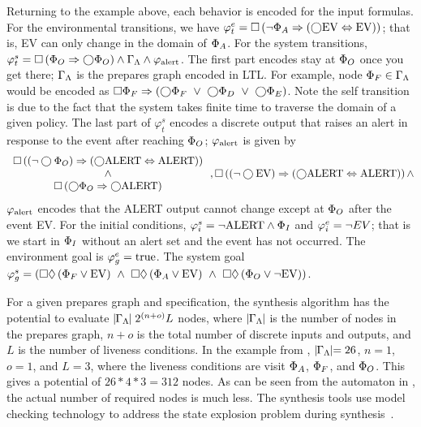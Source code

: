   Returning to the example above, each behavior is encoded for the input
  formulas.  For the environmental transitions, we have $\varphi_t^e =
  \ALWAYS\prl{\NOT \CP_A \Rightarrow \prl{\NEXT \mrm{EV} \Leftrightarrow
      \mrm{EV}}}$; that is, EV can only change in the domain of $\CP_A$.
  For the system transitions, $\varphi_t^s = \ALWAYS\prl{\CP_O
    \Rightarrow \NEXT\CP_O} \AND \GL \AND \varphi_\mrm{alert}$.  The
  first part encodes stay at $\CP_O$ once you get there; $\GL$ is the
  prepares graph encoded in LTL.  For example, node $\CP_F \in \GL$
  would be encoded as $\ALWAYS \CP_F \Rightarrow \prl{\NEXT \CP_F\ \OR \ 
    \NEXT \CP_D\ \OR \ \NEXT\CP_E}$.  Note the self transition is due to
  the fact that the system takes finite time to traverse the domain of a
  given policy.  The last part of $\varphi_t^s$ encodes a discrete
  output that raises an alert in response to the event after reaching
  $\CP_O$; $\varphi_\mrm{alert}$ is given by
  \[
  \bba{c}
  \ALWAYS\prl{\prl{\NOT\NEXT\CP_O} \Rightarrow \prl{\NEXT \mrm{ALERT}
      \Leftrightarrow \mrm{ALERT}}}\\\AND\\\ALWAYS\prl{\NEXT\CP_O \Rightarrow
    \NEXT\mrm{ALERT}}
  \eba
  \, ,
   \ALWAYS\prl{\prl{\NOT\NEXT
      \mrm{EV}} \Rightarrow \prl{\NEXT \mrm{ALERT} \Leftrightarrow
      \mrm{ALERT}}}\\\AND
  \]
  $\varphi_\mrm{alert}$ encodes that the ALERT output cannot change
  except at $\CP_O$ after the event EV.  For the initial conditions,
  $\varphi^s_i = \NOT\mrm{ALERT} \AND \CP_I$ and $\varphi^e_i = \NOT
  EV$; that is we start in $\CP_I$ without an alert set and the event
  has not occurred.  The environment goal is $\varphi_g^e = \mrm{true}$.
  The system goal $\varphi^s_g = \prl{\ALWAYS\EVENTUALLY\prl{\CP_F \OR
      \mrm{EV}}\ \AND\ \ALWAYS\EVENTUALLY\prl{\CP_A \OR \mrm{EV}}\ \AND
         \ \ALWAYS\EVENTUALLY\prl{\CP_O \OR \NOT \mrm{EV}}}$.


 For a given prepares graph and specification, the synthesis algorithm
 has the potential to evaluate $\mid\!\!\GL\!\! \mid 2^{\prl{n+o}} L$
 nodes, where $\mid\!\!\GL\!\!\mid$ is the number of nodes in the prepares
 graph, $n+o$ is the total number of discrete inputs and outputs, and
 $L$ is the number of liveness conditions.  In the example from
 , $\mid\!\!\GL\!\!\mid = 26$, $n = 1$, $o=1$,
 and $L = 3$, where the liveness conditions are visit $\CP_A$, $\CP_F$,
 and $\CP_O$.  This gives a potential of $26*4*3=312$ nodes.  As can be
 seen from the automaton in \refig{approach_automaton}, the actual
 number of required nodes is much less.  The synthesis tools use model
 checking technology to address the state explosion problem during
 synthesis~\cite{hadas_07,piterman_06}.

